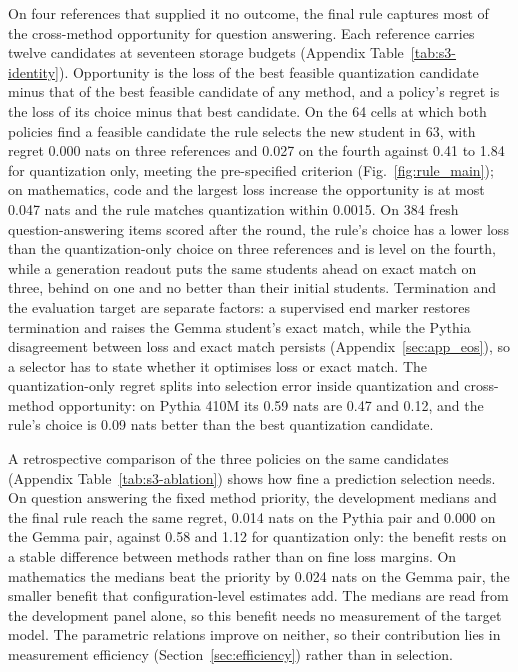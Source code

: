 On four references that supplied it no outcome, the final rule captures most of the cross-method opportunity for question answering. Each reference carries twelve candidates at seventeen storage budgets (Appendix Table~\ref{tab:s3-identity}). Opportunity is the loss of the best feasible quantization candidate minus that of the best feasible candidate of any method, and a policy's regret is the loss of its choice minus that best candidate. On the 64 cells at which both policies find a feasible candidate the rule selects the new student in 63, with regret 0.000 nats on three references and 0.027 on the fourth against 0.41 to 1.84 for quantization only, meeting the pre-specified criterion (Fig.~\ref{fig:rule_main}); on mathematics, code and the largest loss increase the opportunity is at most 0.047 nats and the rule matches quantization within 0.0015. On 384 fresh question-answering items scored after the round, the rule's choice has a lower loss than the quantization-only choice on three references and is level on the fourth, while a generation readout puts the same students ahead on exact match on three, behind on one and no better than their initial students. Termination and the evaluation target are separate factors: a supervised end marker restores termination and raises the Gemma student's exact match, while the Pythia disagreement between loss and exact match persists (Appendix~\ref{sec:app_eos}), so a selector has to state whether it optimises loss or exact match. The quantization-only regret splits into selection error inside quantization and cross-method opportunity: on Pythia 410M its 0.59 nats are 0.47 and 0.12, and the rule's choice is 0.09 nats better than the best quantization candidate. 

A retrospective comparison of the three policies on the same candidates (Appendix
Table~\ref{tab:s3-ablation}) shows how fine a prediction selection needs. On question answering the
fixed method priority, the development medians and the final rule reach the same regret, 0.014 nats on
the Pythia pair and 0.000 on the Gemma pair, against 0.58 and 1.12 for quantization only: the benefit
rests on a stable difference between methods rather than on fine loss margins. On mathematics the
medians beat the priority by 0.024 nats on the Gemma pair, the smaller benefit that
configuration-level estimates add. The medians are read from the development panel alone, so this benefit needs no measurement
of the target model. The parametric relations improve on neither, so their contribution
lies in measurement efficiency (Section~\ref{sec:efficiency}) rather than in selection.
